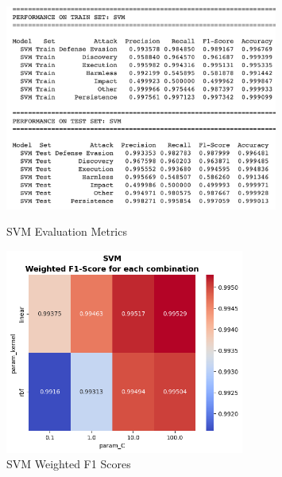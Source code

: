 \begin{figure}[H]
            \begin{minipage}{\textwidth}
                \begin{minipage}[c]{0.48\textwidth}
                    \centering
                    \includegraphics[width=0.8\textwidth]{../figures/plots/section2/SVM_evaluation_metrics.png}
                    \caption{SVM Evaluation Metrics}
                    \label{fig:svm_em_base}
                \end{minipage}%
                \hfill%
                \begin{minipage}[c]{0.48\textwidth}
                    \centering
                    \includegraphics[width=0.7\textwidth]{../figures/plots/section2/weighted_f1_score_for_each_combination_of_parameters_svm.png}
                    \caption{SVM Weighted F1 Scores}
                    \label{fig:svm_f1_tuning}
                \end{minipage}
            \end{minipage}
            

\end{figure}
